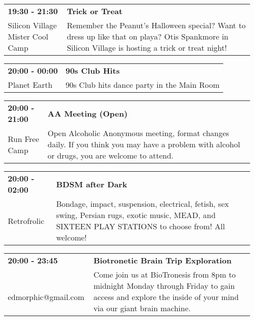 \begin{tabular}{ p{1in} p{2.2in} }
    \textbf{19:30 - 21:30} & \textbf{Trick or Treat} \\
    Silicon Village \newline Mister Cool Camp & Remember the Peanut's Halloween special? Want to dress up like that on playa? Otis Spankmore in Silicon Village is hosting a trick or treat night! \\
    \hline 
\end{tabular}
    
\begin{tabular}{ p{1in} p{2.2in} }
    \textbf{20:00 - 00:00} & \textbf{90s Club Hits} \\
    Planet Earth \newline  & 90s Club hits dance party in the Main Room \\
    \hline 
\end{tabular}
    
\begin{tabular}{ p{1in} p{2.2in} }
    \textbf{20:00 - 21:00} & \textbf{AA Meeting (Open)} \\
    Run Free Camp \newline  & Open Alcoholic Anonymous meeting, format changes daily. If you think you may have a problem with alcohol or drugs, you are welcome to attend. \\
    \hline 
\end{tabular}
    
\begin{tabular}{ p{1in} p{2.2in} }
    \textbf{20:00 - 02:00} & \textbf{BDSM after Dark} \\
    Retrofrolic \newline  & Bondage, impact, suspension, electrical, fetish, sex swing, Persian rugs, exotic music, MEAD, and SIXTEEN PLAY STATIONS to choose from! All welcome! \\
    \hline 
\end{tabular}
    
\begin{tabular}{ p{1in} p{2.2in} }
    \textbf{20:00 - 23:45} & \textbf{Biotronetic Brain Trip Exploration} \\
    ~ \newline edmorphic@gmail.com & Come join us at BioTronesis from 8pm to midnight Monday through Friday to gain access and explore the inside of your mind via our giant brain machine. \\
    \hline 
\end{tabular}
    
